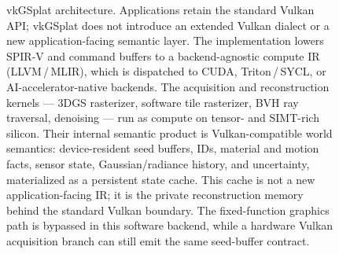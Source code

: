 \documentclass[10pt,journal,onecolumn]{IEEEtran}
\begin{document}
\begin{figure}[t]
\caption{vkGSplat architecture. Applications retain the standard Vulkan
API; vkGSplat does not introduce an extended Vulkan dialect or a new
application-facing semantic layer. The
implementation lowers SPIR-V and command buffers to a
backend-agnostic compute IR (LLVM\,/\,MLIR), which is dispatched to
CUDA, Triton\,/\,SYCL, or AI-accelerator-native backends. The
acquisition and reconstruction kernels --- 3DGS rasterizer, software tile
rasterizer, BVH ray traversal, denoising --- run as compute on tensor- and
SIMT-rich silicon. Their internal semantic product is Vulkan-compatible world
semantics: device-resident seed buffers, IDs, material and motion facts, sensor
state, Gaussian/radiance history, and uncertainty, materialized as a persistent
state cache. This cache is not a new application-facing IR; it is the private
reconstruction memory behind the standard Vulkan boundary. The fixed-function graphics path is
bypassed in this software backend, while a hardware Vulkan acquisition branch
can still emit the same seed-buffer contract.}
\label{fig:arch}
\end{figure}
\end{document}

